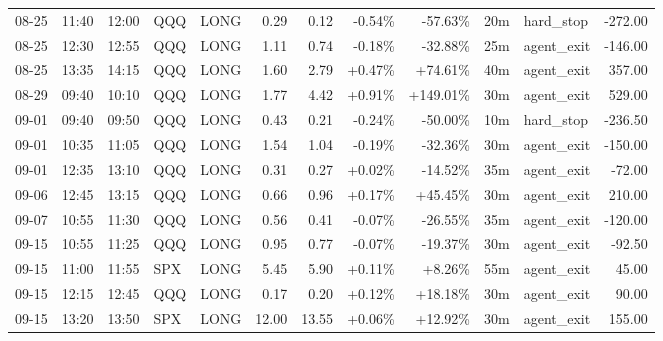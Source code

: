 \documentclass[11pt,a4paper,twoside]{article}
\begin{document}
\begin{center}
\begin{longtable}{>{\color{txtmain}}l l l l l r r r r r >{\color{txtmain}}l r}
08-25 & 11:40 & 12:00 & QQQ & LONG & 0.29 & 0.12 & \textcolor{lossred}{-0.54\%} & \textcolor{lossred}{-57.63\%} & 20m & hard\_stop & \textcolor{lossred}{-272.00} \\
08-25 & 12:30 & 12:55 & QQQ & LONG & 1.11 & 0.74 & \textcolor{lossred}{-0.18\%} & \textcolor{lossred}{-32.88\%} & 25m & agent\_exit & \textcolor{lossred}{-146.00} \\
08-25 & 13:35 & 14:15 & QQQ & LONG & 1.60 & 2.79 & \textcolor{wingreen}{+0.47\%} & \textcolor{wingreen}{+74.61\%} & 40m & agent\_exit & \textcolor{wingreen}{357.00} \\
08-29 & 09:40 & 10:10 & QQQ & LONG & 1.77 & 4.42 & \textcolor{wingreen}{+0.91\%} & \textcolor{wingreen}{+149.01\%} & 30m & agent\_exit & \textcolor{wingreen}{529.00} \\
09-01 & 09:40 & 09:50 & QQQ & LONG & 0.43 & 0.21 & \textcolor{lossred}{-0.24\%} & \textcolor{lossred}{-50.00\%} & 10m & hard\_stop & \textcolor{lossred}{-236.50} \\
09-01 & 10:35 & 11:05 & QQQ & LONG & 1.54 & 1.04 & \textcolor{lossred}{-0.19\%} & \textcolor{lossred}{-32.36\%} & 30m & agent\_exit & \textcolor{lossred}{-150.00} \\
09-01 & 12:35 & 13:10 & QQQ & LONG & 0.31 & 0.27 & \textcolor{wingreen}{+0.02\%} & \textcolor{lossred}{-14.52\%} & 35m & agent\_exit & \textcolor{lossred}{-72.00} \\
09-06 & 12:45 & 13:15 & QQQ & LONG & 0.66 & 0.96 & \textcolor{wingreen}{+0.17\%} & \textcolor{wingreen}{+45.45\%} & 30m & agent\_exit & \textcolor{wingreen}{210.00} \\
09-07 & 10:55 & 11:30 & QQQ & LONG & 0.56 & 0.41 & \textcolor{lossred}{-0.07\%} & \textcolor{lossred}{-26.55\%} & 35m & agent\_exit & \textcolor{lossred}{-120.00} \\
09-15 & 10:55 & 11:25 & QQQ & LONG & 0.95 & 0.77 & \textcolor{lossred}{-0.07\%} & \textcolor{lossred}{-19.37\%} & 30m & agent\_exit & \textcolor{lossred}{-92.50} \\
09-15 & 11:00 & 11:55 & SPX & LONG & 5.45 & 5.90 & \textcolor{wingreen}{+0.11\%} & \textcolor{wingreen}{+8.26\%} & 55m & agent\_exit & \textcolor{wingreen}{45.00} \\
09-15 & 12:15 & 12:45 & QQQ & LONG & 0.17 & 0.20 & \textcolor{wingreen}{+0.12\%} & \textcolor{wingreen}{+18.18\%} & 30m & agent\_exit & \textcolor{wingreen}{90.00} \\
09-15 & 13:20 & 13:50 & SPX & LONG & 12.00 & 13.55 & \textcolor{wingreen}{+0.06\%} & \textcolor{wingreen}{+12.92\%} & 30m & agent\_exit & \textcolor{wingreen}{155.00} \\

\end{longtable}
\end{center}
\end{document}
